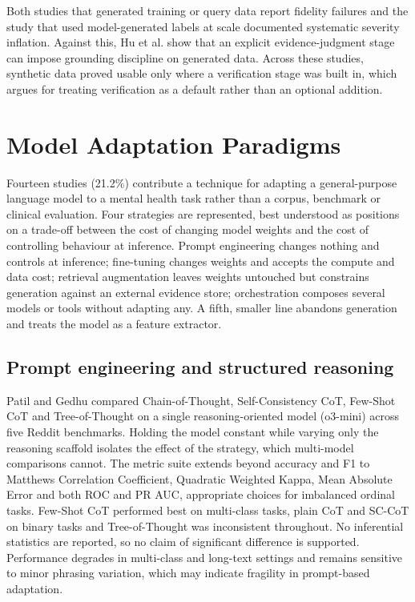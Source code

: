 \documentclass[11pt]{article}
\begin{document}
	Both studies that generated training or query data report fidelity failures and the study that used model-generated labels at scale documented systematic severity inflation. Against this, Hu et al. show that an explicit evidence-judgment stage can impose grounding discipline on generated data. Across these studies, synthetic data proved usable only where a verification stage was built in, which argues for treating verification as a default rather than an optional addition.
	\section{Model Adaptation Paradigms}
	
	Fourteen studies (21.2\%) contribute a technique for adapting a general-purpose language model to a mental health task rather than a corpus, benchmark or clinical evaluation. Four strategies are represented, best understood as positions on a trade-off between the cost of changing model weights and the cost of controlling behaviour at inference. Prompt engineering changes nothing and controls at inference; fine-tuning changes weights and accepts the compute and data cost; retrieval augmentation leaves weights untouched but constrains generation against an external evidence store; orchestration composes several models or tools without adapting any. A fifth, smaller line abandons generation and treats the model as a feature extractor.
	
	\subsection{Prompt engineering and structured reasoning}
	
	Patil and Gedhu\cite{patil2026cognitivementalllm} compared Chain-of-Thought, Self-Consistency CoT, Few-Shot CoT and Tree-of-Thought on a single reasoning-oriented model (o3-mini) across five Reddit benchmarks. Holding the model constant while varying only the reasoning scaffold isolates the effect of the strategy, which multi-model comparisons cannot. The metric suite extends beyond accuracy and F1 to Matthews Correlation Coefficient, Quadratic Weighted Kappa, Mean Absolute Error and both ROC and PR AUC, appropriate choices for imbalanced ordinal tasks. Few-Shot CoT performed best on multi-class tasks, plain CoT and SC-CoT on binary tasks and Tree-of-Thought was inconsistent throughout. No inferential statistics are reported, so no claim of significant difference is supported. Performance degrades in multi-class and long-text settings and remains sensitive to minor phrasing variation, which may indicate fragility in prompt-based adaptation.
	
\end{document}
